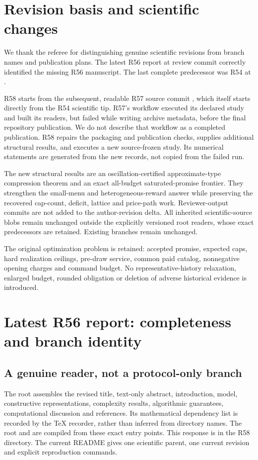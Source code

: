 \section*{Revision basis and scientific changes}
We thank the referee for distinguishing genuine scientific revisions from branch names and publication plans. The latest R56 report at review commit  correctly identified the missing R56 manuscript. The last complete predecessor was R54 at .

R58 starts from the subsequent, readable R57 source commit , which itself starts directly from the R54 scientific tip. R57's workflow executed its declared study and built its readers, but failed while writing archive metadata, before the final repository publication. We do not describe that workflow as a completed publication. R58 repairs the packaging and publication checks, supplies additional structural results, and executes a new source-frozen study. Its numerical statements are generated from the new records, not copied from the failed run.

The new structural results are an oscillation-certified approximate-type compression theorem and an exact all-budget saturated-promise frontier. They strengthen the small-menu and heterogeneous-reward answer while preserving the recovered cap-count, deficit, lattice and price-path work. Reviewer-output commits are not added to the author-revision delta. All inherited scientific-source blobs remain unchanged outside the explicitly versioned root readers, whose exact predecessors are retained. Existing branches remain unchanged.

The original optimization problem is retained: accepted promise, expected caps, hard realization ceilings, pre-draw service, common paid catalog, nonnegative opening charges and command budget. No representative-history relaxation, enlarged budget, rounded obligation or deletion of adverse historical evidence is introduced.

\section{Latest R56 report: completeness and branch identity}
\subsection{A genuine reader, not a protocol-only branch}
The root  assembles the revised title, text-only abstract, introduction, model, constructive representations, complexity results, algorithmic guarantees, computational discussion and references. Its mathematical dependency list is recorded by the TeX recorder, rather than inferred from directory names. The root  and  are compiled from these exact entry points. This response is  in the R58 directory. The current README gives one scientific parent, one current revision and explicit reproduction commands.

